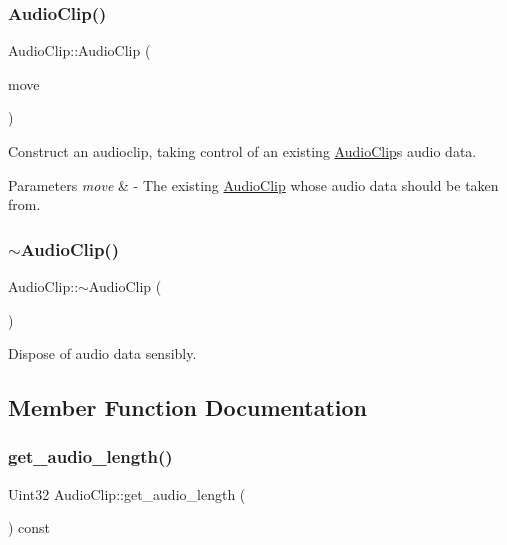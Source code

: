 \subsubsection{\texorpdfstring{Audio\+Clip()}{AudioClip()}\hspace{0.1cm}{\footnotesize\ttfamily [3/3]}}
{\footnotesize\ttfamily Audio\+Clip\+::\+Audio\+Clip (\begin{DoxyParamCaption}\item[{\mbox{\hyperlink{class_audio_clip}{Audio\+Clip}} \&\&}]{move }\end{DoxyParamCaption})}

Construct an audioclip, taking control of an existing \mbox{\hyperlink{class_audio_clip}{Audio\+Clip}}\textquotesingle{}s audio data. 
\begin{DoxyParams}{Parameters}
{\em move} & -\/ The existing \mbox{\hyperlink{class_audio_clip}{Audio\+Clip}} whose audio data should be taken from. \\
\hline
\end{DoxyParams}
\mbox{\label{class_audio_clip_ab929796e463c51c50f2ad4e9acec35da}} 
\subsubsection{\texorpdfstring{$\sim$\+Audio\+Clip()}{~AudioClip()}}
{\footnotesize\ttfamily Audio\+Clip\+::$\sim$\+Audio\+Clip (\begin{DoxyParamCaption}{ }\end{DoxyParamCaption})\hspace{0.3cm}{\ttfamily [virtual]}}

Dispose of audio data sensibly. 

\subsection{Member Function Documentation}
\mbox{\label{class_audio_clip_ae4ff05317126ce507a64c836f524ca4f}} 
\subsubsection{\texorpdfstring{get\+\_\+audio\+\_\+length()}{get\_audio\_length()}}
{\footnotesize\ttfamily Uint32 Audio\+Clip\+::get\+\_\+audio\+\_\+length (\begin{DoxyParamCaption}{ }\end{DoxyParamCaption}) const}

